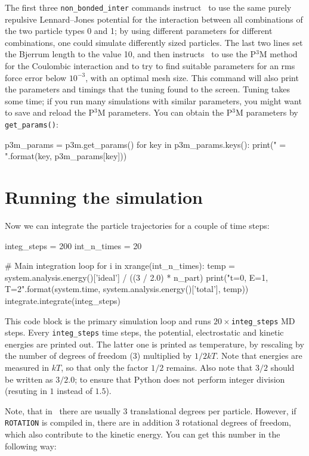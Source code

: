 \documentclass[
a4paper,                        %
11pt,                           %
twoside,                        %
footsepline,                    %
headsepline,                    %
headexclude,                    %
footexclude,                    %
pagesize,                       %
]{scrartcl}
\begin{document}
The first three \verb|non_bonded_inter| commands instruct \es\ to use the same
purely repulsive Lennard--Jones potential for the interaction between
all combinations of the two particle types 0 and 1; by using different
parameters for different combinations, one could simulate differently
sized particles.  The last two lines set the Bjerrum length to the value
10, and then instructs \es\ to use the P$^3$M method for the Coulombic
interaction and to try to find suitable parameters for an rms force
error below $10^{-3}$, with an optimal mesh size. This command will also print 
the parameters and timings that the tuning found to the screen. Tuning takes 
some time; if you run many simulations with similar parameters, you might want 
to save and reload
the P$^3$M parameters. You can obtain the P$^3$M parameters by
\verb|get_params()|:

\begin{tclcode}
p3m_params = p3m.get_params()
for key in p3m_params.keys():
    print("{} = {}".format(key, p3m_params[key]))
\end{tclcode}


\section{Running the simulation}

Now we can integrate the particle trajectories for a couple of time
steps:

\begin{tclcode}
integ_steps = 200
int_n_times = 20

# Main integration loop
for i in xrange(int_n_times):
    temp = system.analysis.energy()['ideal'] / ((3 / 2.0) * n_part)
    print("t={0}, E={1}, T={2}".format(system.time,
                                       system.analysis.energy()['total'], temp))
    integrate.integrate(integ_steps)
\end{tclcode}

This code block is the primary simulation loop and runs
$20\times$\verb|integ_steps| MD steps. Every \verb|integ_steps| time
steps, the potential, electrostatic and kinetic energies are printed
out. The latter one is printed as temperature, by rescaling by the
number of degrees of freedom (3) multiplied by $1/2kT$. Note that
energies are measured in $kT$, so that only the factor $1/2$
remains. Also note that $3/2$ should be written as $3/2.0$; to ensure
that Python does not perform integer division (resuting in $1$ instead of
$1.5$).

Note, that in \es\ there are usually 3 translational degrees per
particle. However, if \verb|ROTATION| is compiled in, there are in
addition 3 rotational degrees of freedom, which also contribute to the
kinetic energy.  You can get this number in the following way:
\end{document}
